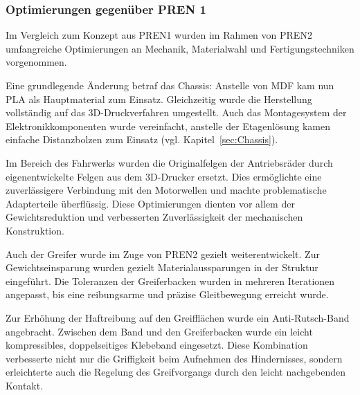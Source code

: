 \documentclass[main.tex]{subfiles} %
\begin{document}

\subsubsection{Optimierungen gegenüber PREN 1}

Im Vergleich zum Konzept aus PREN1 wurden im Rahmen von PREN2 umfangreiche Optimierungen an Mechanik, 
Materialwahl und Fertigungstechniken vorgenommen.

Eine grundlegende Änderung betraf das Chassis: Anstelle von MDF kam nun PLA als Hauptmaterial zum Einsatz. 
Gleichzeitig wurde die Herstellung vollständig auf das 3D-Druckverfahren umgestellt.
Auch das Montagesystem der Elektronikkomponenten wurde vereinfacht, anstelle der Etagenlösung 
kamen einfache Distanzbolzen zum Einsatz (vgl. Kapitel~\ref{sec:Chassis}).

Im Bereich des Fahrwerks wurden die Originalfelgen der Antriebsräder durch eigenentwickelte 
Felgen aus dem 3D-Drucker ersetzt. Dies ermöglichte eine zuverlässigere Verbindung mit den Motorwellen und 
machte problematische Adapterteile überflüssig. Diese Optimierungen dienten vor allem der Gewichtsreduktion und 
verbesserten Zuverlässigkeit der mechanischen Konstruktion.

Auch der Greifer wurde im Zuge von PREN2 gezielt weiterentwickelt. Zur Gewichtseinsparung wurden 
gezielt Materialaussparungen in der Struktur eingeführt. Die Toleranzen der Greiferbacken wurden 
in mehreren Iterationen angepasst, bis eine reibungsarme und präzise Gleitbewegung erreicht wurde.

Zur Erhöhung der Haftreibung auf den Greifflächen wurde ein Anti-Rutsch-Band angebracht. 
Zwischen dem Band und den Greiferbacken wurde ein leicht kompressibles, doppelseitiges Klebeband eingesetzt. 
Diese Kombination verbesserte nicht nur die Griffigkeit beim Aufnehmen des Hindernisses, sondern 
erleichterte auch die Regelung des Greifvorgangs durch den leicht nachgebenden Kontakt.
\end{document}
